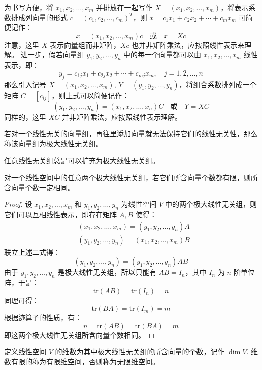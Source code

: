 为书写方便，将 $x_1,x_2,\ldots,x_m$ 并排放在一起写作 $X=(x_1,x_2,\ldots,x_m)$，将表示系数排成列向量的形式 $c=(c_1,c_2,\ldots,c_m)^T$，则 $x=c_1x_1+c_2x_2+\cdots+c_mx_m$ 可简便记作：
\[
    x=(x_1,x_2,\ldots,x_m)c\quad\text{或}\quad x=Xc
\]
注意，这里 $X$ 表示向量组而非矩阵，$Xc$ 也并非矩阵乘法，应按照线性表示来理解。
进一步，假若向量组 $y_1,y_2,\ldots,y_n$ 中的每一个向量都可以由 $x_1,x_2,\ldots,x_m$ 线性表示，即：
\[
    y_j=c_{1j}x_1+c_{2j}x_2+\cdots+c_{mj}x_m,\quad j=1,2,\ldots,n
\]
那么引入记号 $X=(x_1,x_2,\ldots,x_m),\,Y=(y_1,y_2,\ldots,y_n)$，将组合系数排列成一个矩阵 $C=[c_{ij}]$，则上式可以简便记作：
\[
    (y_1,y_2,\ldots,y_n)=(x_1,x_2,\ldots,x_n)C\quad\text{或}\quad Y=XC
\]
同样的，这里 $XC$ 并非矩阵乘法，应按照线性表示理解。

\begin{definition}[极大线性无关组]
若对一个线性无关的向量组，再往里添加向量就无法保持它们的线性无关性，那么称该向量组为极大线性无关组。
\end{definition}

\begin{lemma}
任意线性无关组总是可以扩充为极大线性无关组。
\end{lemma}

\begin{theorem}
\label{thm:maxlinear}
对一个线性空间中的任意两个极大线性无关组，若它们所含向量个数都有限，则所含向量个数一定相同。
\end{theorem}

\begin{proof}
设 $x_1,x_2,\ldots,x_m$ 和 $y_1,y_2,\ldots,y_n$ 为线性空间 $V$ 中的两个极大线性无关组，则它们可以互相线性表示，即存在矩阵 $A,B$ 使得：
\begin{align*}
    &(x_1,x_2,\ldots,x_m)=(y_1,y_2,\ldots,y_n)A\\
    &(y_1,y_2,\ldots,y_n)=(x_1,x_2,\ldots,x_m)B
\end{align*}
联立上述二式得：
\[
    (y_1,y_2,\ldots,y_n)=(y_1,y_2,\ldots,y_n)AB
\]
由于 $y_1,y_2,\ldots,y_n$ 是极大线性无关组，所以只能有 $AB=I_n$，其中 $I_n$ 为 $n$ 阶单位阵，于是：
\[
    \text{tr}(AB)=\text{tr}(I_n)=n
\]
同理可得：
\[
    \text{tr}(BA)=\text{tr}(I_m)=m
\]
根据迹算子的性质，有：
\[
    n=\text{tr}(AB)=\text{tr}(BA)=m
\]
即这两个极大线性无关组所含向量个数相同。
\end{proof}

\begin{definition}[线性空间的维数]
定义线性空间 $V$ 的维数为其中极大线性无关组的所含向量的个数，记作 $\dim V$. 维数有限的称为有限维空间，否则称为无限维空间。
\end{definition}


